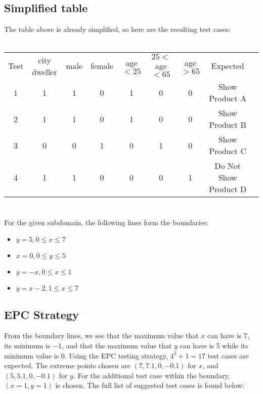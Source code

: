\documentclass[letterpaper]{article}
\begin{document}
\subsection{Simplified table}
The table above is already simplified, so here are the resulting test cases:
\\ \\
\begin{adjustbox}{center}
	\begin{tabular}{ccccccccc}
		Test & city dweller & male & female & age $<25$ & $25<$ age $<65$ & age $>65$ & Expected              \\ \cline{1-1} \cline{8-8}
		1    & 1            & 1    & 0      & 1         & 0               & 0         & Show Product A        \\
		2    & 1            & 1    & 0      & 1         & 0               & 0         & Show Product B        \\
		3    & 0            & 0    & 1      & 0         & 1               & 0         & Show Product C        \\
		4    & 1            & 1    & 0      & 0         & 0               & 1         & Do Not Show Product D \\
	\end{tabular}
\end{adjustbox}

\section{}
For the given subdomain, the following lines form the boundaries:
\begin{itemize}
	\item $y=5, 0\leq x\leq 7$
	\item $x=0, 0\leq y \leq 5$
	\item $y=-x, 0\leq x\leq 1$
	\item $y=x-2, 1\leq x \leq 7$
\end{itemize}

\subsection{EPC Strategy}
From the boundary lines, we see that the maximum value that $x$ can have is
$7$, its minimum is $-1$, and that the maximum value that $y$ can have is
5 while its minimum value is 0. Using the EPC testing strategy,
$4^2 + 1=17$ test cases are expected. The extreme points chosen are
$(7, 7.1, 0, -0.1)$ for $x$, and $(5, 5.1, 0, -0.1)$ for $y$.
For the additional test case within the boundary, $(x=1, y=1)$ is chosen.
The full list of suggested test cases is found below:
\end{document}
